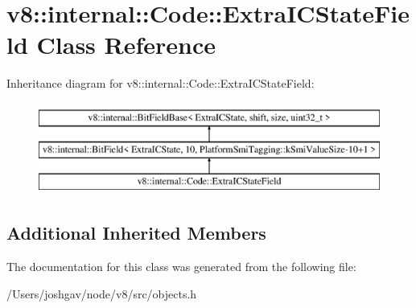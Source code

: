 \hypertarget{classv8_1_1internal_1_1_code_1_1_extra_i_c_state_field}{}\section{v8\+:\+:internal\+:\+:Code\+:\+:Extra\+I\+C\+State\+Field Class Reference}
\label{classv8_1_1internal_1_1_code_1_1_extra_i_c_state_field}
Inheritance diagram for v8\+:\+:internal\+:\+:Code\+:\+:Extra\+I\+C\+State\+Field\+:\begin{figure}[H]
\begin{center}
\leavevmode
\includegraphics[height=3.000000cm]{classv8_1_1internal_1_1_code_1_1_extra_i_c_state_field}
\end{center}
\end{figure}
\subsection*{Additional Inherited Members}


The documentation for this class was generated from the following file\+:\begin{DoxyCompactItemize}
\item 
/\+Users/joshgav/node/v8/src/objects.\+h\end{DoxyCompactItemize}
